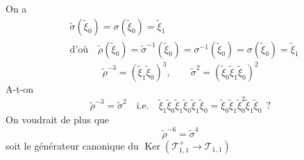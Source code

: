 \documentclass[11pt,a4paper]{article}
\begin{document}
On a
\[
\begin{aligned}
&\tilde\sigma(\tilde\xi_0)=\sigma(\tilde\xi_0)=\tilde\xi_1\\
&\text{d'où}\quad \tilde\rho(\tilde\xi_0)=\tilde\sigma^{-1}(\tilde\xi_0)=\sigma^{-1}(\tilde\xi_0)=\sigma(\tilde\xi_0)=\tilde\xi_1
\end{aligned}
\]
\[
\tilde\rho^{-3}=(\tilde\xi_1\tilde\xi_0)^3,\qquad \tilde\sigma^2=(\tilde\xi_0\tilde\xi_1\tilde\xi_0)^2
\]
A-t-on
\[
\tilde\rho^{-3}=\tilde\sigma^2\quad\text{i.e.}\quad
\tilde\xi_1\tilde\xi_0\tilde\xi_1\tilde\xi_0\tilde\xi_1\tilde\xi_0=\tilde\xi_0\tilde\xi_1\tilde\xi_0^{2}\tilde\xi_1\tilde\xi_0\ \ ?
\]
On voudrait de plus que
\[
\tilde\rho^{-6}=\tilde\sigma^4
\]
soit le générateur canonique du $\operatorname{Ker}(\mathcal{T}^{+}_{1,1}\to\mathcal{T}_{1,1})$
\end{document}
